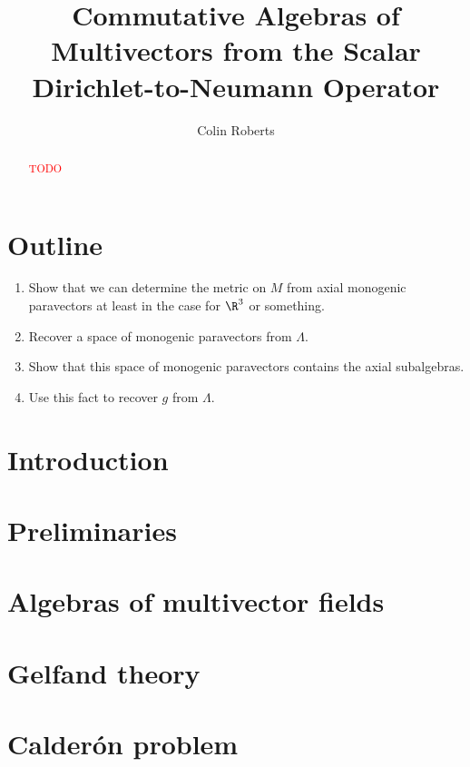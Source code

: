 \documentclass[12pt]{article}
\title{Commutative Algebras of Multivectors from the Scalar Dirichlet-to-Neumann Operator}
\author{Colin Roberts}
\begin{document}
 \begin{titlingpage}
     \maketitle
     \vfill
     \begin{abstract}
        \textcolor{red}{TODO}
     \end{abstract}
 \end{titlingpage}

\section{Outline}
\begin{enumerate}
    \item Show that we can determine the metric on $M$ from axial monogenic paravectors at least in the case for $\R^3$ or something.
    \item Recover a space of monogenic paravectors from $\Lambda$.
    \item Show that this space of monogenic paravectors contains the axial subalgebras.
    \item Use this fact to recover $g$ from $\Lambda$.
\end{enumerate}


\section{Introduction}


\section{Preliminaries}


\section{Algebras of multivector fields}


\section{Gelfand theory}


\section{Calder\'on problem}

\end{document}
